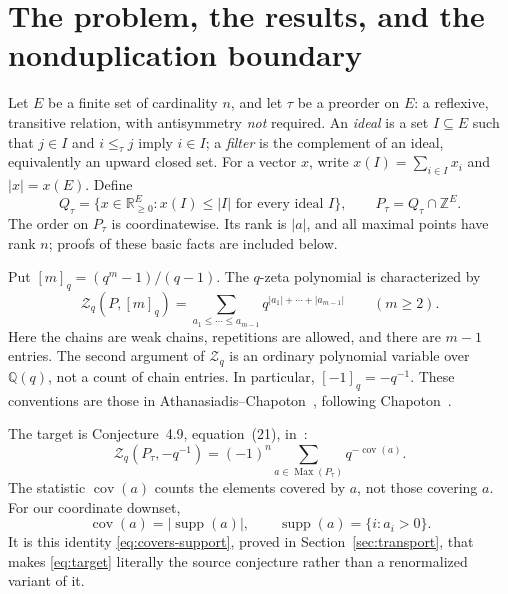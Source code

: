 \documentclass[11pt]{article}
\numberwithin{equation}{section}
\theoremstyle{definition}
\theoremstyle{remark}
\newcommand{\Z}{\mathbb Z}
\newcommand{\Q}{\mathbb Q}
\newcommand{\R}{\mathbb R}
\newcommand{\supp}{\operatorname{supp}}
\newcommand{\Max}{\operatorname{Max}}
\newcommand{\cov}{\operatorname{cov}}
\newcommand{\qint}[1]{[#1]_q}
\newcommand{\Zeta}{\mathcal Z}
\begin{document}
\tableofcontents
\clearpage

\section{The problem, the results, and the nonduplication boundary}
\label{sec:problem}

Let $E$ be a finite set of cardinality $n$, and let $\tau$ be a preorder on
$E$: a reflexive, transitive relation, with antisymmetry \emph{not} required.
An \emph{ideal} is a set $I\subseteq E$ such that $j\in I$ and $i\le_\tau j$
imply $i\in I$; a \emph{filter} is the complement of an ideal, equivalently an
upward closed set. For a vector $x$, write $x(I)=\sum_{i\in I}x_i$ and
$|x|=x(E)$. Define
\begin{equation}
 Q_\tau=\{x\in\R_{\ge0}^E:x(I)\le |I|\text{ for every ideal }I\},
 \qquad P_\tau=Q_\tau\cap\Z^E.
 \label{eq:preorder-polytope}
\end{equation}
The order on $P_\tau$ is coordinatewise. Its rank is $|a|$, and all maximal
points have rank $n$; proofs of these basic facts are included below.

Put $\qint m=(q^m-1)/(q-1)$. The $q$-zeta polynomial is characterized by
\begin{equation}
 \Zeta_q(P,\qint m)
 =\sum_{a_1\le\cdots\le a_{m-1}}q^{|a_1|+\cdots+|a_{m-1}|}
 \qquad(m\ge2).
 \label{eq:qzeta-def}
\end{equation}
Here the chains are weak chains, repetitions are allowed, and there are
\emph{$m-1$} entries. The second argument of $\Zeta_q$ is an ordinary
polynomial variable over $\Q(q)$, not a count of chain entries. In particular,
$\qint{-1}=-q^{-1}$. These conventions are those in
Athanasiadis--Chapoton~\cite[Section~4.4]{AC}, following
Chapoton~\cite{Chapoton}.

The target is Conjecture~4.9, equation~(21), in~\cite{AC}:
\begin{equation}
 \boxed{\displaystyle
 \Zeta_q(P_\tau,-q^{-1})
 =(-1)^n\sum_{a\in\Max(P_\tau)}q^{-\cov(a)}.}
 \label{eq:target}
\end{equation}
The statistic $\cov(a)$ counts the elements covered by $a$, not those covering
$a$. For our coordinate downset,
\begin{equation}
 \cov(a)=|\supp(a)|,\qquad \supp(a)=\{i:a_i>0\}.
 \label{eq:covers-support}
\end{equation}
It is this identity \eqref{eq:covers-support}, proved in
Section~\ref{sec:transport}, that makes \eqref{eq:target} literally the source
conjecture rather than a renormalized variant of it.
\end{document}
